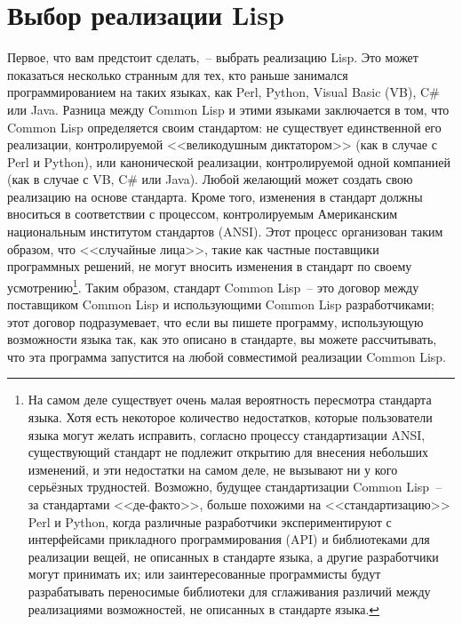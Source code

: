 \section{Выбор реализации Lisp}

Первое, что вам предстоит сделать,~-- выбрать реализацию Lisp. Это может показаться
несколько странным для тех, кто раньше занимался программированием на таких языках, как Perl,
Python, Visual Basic (VB), C\# или Java. Разница между Common Lisp и этими языками
заключается в том, что Common Lisp определяется своим стандартом: не существует
единственной его реализации, контро\-ли\-руе\-мой <<великодушным диктатором>> (как в случае с Perl
и Python), или канонической реализации, контролируемой одной компанией (как в случае с VB,
C\# или Java). Любой желающий может создать свою реализацию на основе стандарта. Кроме
того, изменения в стандарт должны вноситься в соответствии с процессом, контролируемым
Американским национальным институтом стандартов (ANSI). Этот процесс организован таким
образом, что <<случайные лица>>, такие как частные поставщики программных решений, не могут
вносить изменения в стандарт по своему усмотрению\footnote{На самом деле существует очень
  малая вероятность пересмотра стандарта языка. Хотя есть некоторое количество
  недостатков, которые пользователи языка могут желать исправить, согласно процессу
  стандартизации ANSI, существующий стандарт не подлежит открытию для внесения небольших
  изменений, и эти недостатки на самом деле, не вызывают ни у кого серьёзных
  трудностей. Возможно, будущее стандартизации Common Lisp~-- за стандартами <<де-факто>>,
  больше похожими на <<стандартизацию>> Perl и Python, когда различные разработчики
  экспериментируют с интерфейсами прикладного программирования (API) и библиотеками для
  реализации вещей, не описанных в стандарте языка, а другие разработчики могут принимать
  их; или заинтересованные программисты будут разрабатывать переносимые библиотеки для
  сглаживания различий между реализациями возможностей, не описанных в стандарте
  языка.}. Таким образом, стандарт Common Lisp~-- это договор между поставщиком Common
Lisp и использующими Common Lisp разработчиками; этот договор подразумевает, что если вы
пишете программу, использующую возможности языка так, как это описано в стандарте, вы
можете рассчитывать, что эта программа запустится на любой совместимой реализации Common
Lisp.

